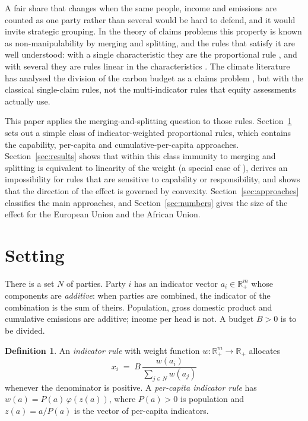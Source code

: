 \documentclass[11pt]{article}
\theoremstyle{definition}
\newtheorem{definition}{Definition}
\theoremstyle{remark}
\begin{document}
A fair share that changes when the same people, income and emissions are counted as one party rather than several would be hard to defend, and it would invite strategic grouping. In the theory of claims problems this property is known as non-manipulability by merging and splitting, and the rules that satisfy it are well understood: with a single characteristic they are the proportional rule \cite{oneill,chun,defrutos}, and with several they are rules linear in the characteristics \cite{jms}. The climate literature has analysed the division of the carbon budget as a claims problem \cite{gg2016,gg2020}, but with the classical single-claim rules, not the multi-indicator rules that equity assessments actually use.

This paper applies the merging-and-splitting question to those rules. Section~\ref{sec:setting} sets out a simple class of indicator-weighted proportional rules, which contains the capability, per-capita and cumulative-per-capita approaches. Section~\ref{sec:results} shows that within this class immunity to merging and splitting is equivalent to linearity of the weight (a special case of \cite{jms}), derives an impossibility for rules that are sensitive to capability or responsibility, and shows that the direction of the effect is governed by convexity. Section~\ref{sec:approaches} classifies the main approaches, and Section~\ref{sec:numbers} gives the size of the effect for the European Union and the African Union.

\section{Setting}\label{sec:setting}

There is a set $N$ of parties. Party $i$ has an indicator vector $a_i\in\mathbb{R}^m_{+}$ whose components are \emph{additive}: when parties are combined, the indicator of the combination is the sum of theirs. Population, gross domestic product and cumulative emissions are additive; income per head is not. A budget $B>0$ is to be divided.

\begin{definition}
An \emph{indicator rule} with weight function $w:\mathbb{R}^m_{+}\to\mathbb{R}_{+}$ allocates
\[
x_i \;=\; B\,\frac{w(a_i)}{\sum_{j\in N} w(a_j)}
\]
whenever the denominator is positive. A \emph{per-capita indicator rule} has $w(a)=P(a)\,\varphi(z(a))$, where $P(a)>0$ is population and $z(a)=a/P(a)$ is the vector of per-capita indicators.
\end{definition}
\end{document}
